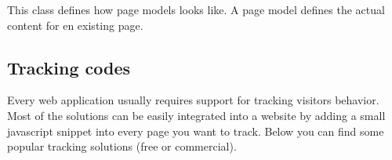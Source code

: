 \documentclass[letterpaper,10pt,english]{sphinxmanual}
\begin{document}

\begin{fulllineitems}
\label{features/components/dynamic_pages/dynamic_pages:fantastico.contrib.dynamic_pages.models.pages.DynamicPageModel}
This class defines how page models looks like. A page model defines the actual content for en existing page.

\end{fulllineitems}



\subsection{Tracking codes}
\label{features/components/tracking_codes/tracking_codes:tracking-codes}\label{features/components/tracking_codes/tracking_codes::doc}
Every web application usually requires support for tracking visitors behavior. Most of the solutions can be easily integrated
into a website by adding a small javascript snippet into every page you want to track. Below you can find some popular tracking
solutions (free or commercial).
\end{document}
